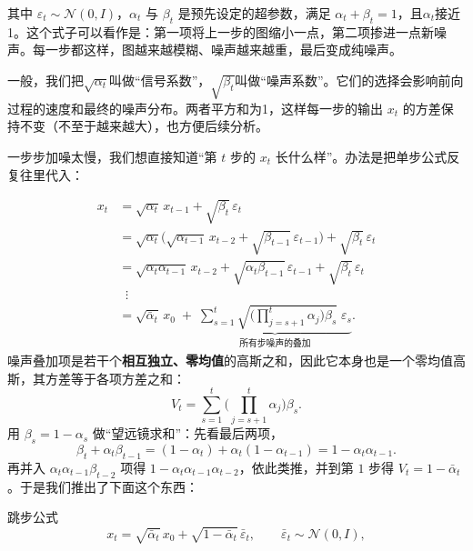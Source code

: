其中 $\varepsilon_t\sim\mathcal N(0,I)$，$\alpha_t$ 与 $\beta_t$ 是预先设定的超参数，满足 $\alpha_t+\beta_t=1$，且$\alpha_t$接近1。这个式子可以看作是：第一项将上一步的图缩小一点，第二项掺进一点新噪声。每一步都这样，图越来越模糊、噪声越来越重，最后变成纯噪声。

一般，我们把$\sqrt{\alpha_t}$叫做“信号系数”，$\sqrt{\beta_t}$叫做“噪声系数”。它们的选择会影响前向过程的速度和最终的噪声分布。两者平方和为1，这样每一步的输出 $x_t$ 的方差保持不变（不至于越来越大），也方便后续分析。

一步步加噪太慢，我们想直接知道“第 $t$ 步的 $x_t$ 长什么样”。办法是把单步公式反复往里代入：

\begin{align}
x_t &= \sqrt{\alpha_t}\,x_{t-1} + \sqrt{\beta_t}\,\varepsilon_t \\
&= \sqrt{\alpha_t}\big(\sqrt{\alpha_{t-1}}\,x_{t-2}+\sqrt{\beta_{t-1}}\,\varepsilon_{t-1}\big) + \sqrt{\beta_t}\,\varepsilon_t \\
&= \sqrt{\alpha_t\alpha_{t-1}}\,x_{t-2} + \sqrt{\alpha_t\beta_{t-1}}\,\varepsilon_{t-1} + \sqrt{\beta_t}\,\varepsilon_t \\
&\;\;\vdots \\
&= \sqrt{\bar\alpha_t}\,x_0 \;+\; \underbrace{\sum_{s=1}^{t}\sqrt{\Big(\textstyle\prod_{j=s+1}^{t}\alpha_j\Big)\beta_s}\;\varepsilon_s}_{\text{所有步噪声的叠加}}.
\end{align}
噪声叠加项是若干个\textbf{相互独立、零均值}的高斯之和，因此它本身也是一个零均值高斯，其方差等于各项方差之和：
\begin{equation}
V_t = \sum_{s=1}^{t}\Big(\textstyle\prod_{j=s+1}^{t}\alpha_j\Big)\beta_s.
\end{equation}
用 $\beta_s = 1-\alpha_s$ 做“望远镜求和”：先看最后两项，
\begin{equation}
\beta_t + \alpha_t\beta_{t-1} = (1-\alpha_t) + \alpha_t(1-\alpha_{t-1}) = 1-\alpha_t\alpha_{t-1}.
\end{equation}
再并入 $\alpha_t\alpha_{t-1}\beta_{t-2}$ 项得 $1-\alpha_t\alpha_{t-1}\alpha_{t-2}$，依此类推，并到第 $1$ 步得 $V_t = 1-\bar\alpha_t$。于是我们推出了下面这个东西：

\begin{theorem}{跳步公式}{}
\begin{equation}\label{eq:ddpm_reparam}
x_t = \sqrt{\bar\alpha_t}\,x_0 + \sqrt{1-\bar\alpha_t}\,\bar\varepsilon_t, \qquad \bar\varepsilon_t\sim\mathcal N(0,I),
\end{equation}
\end{theorem}


